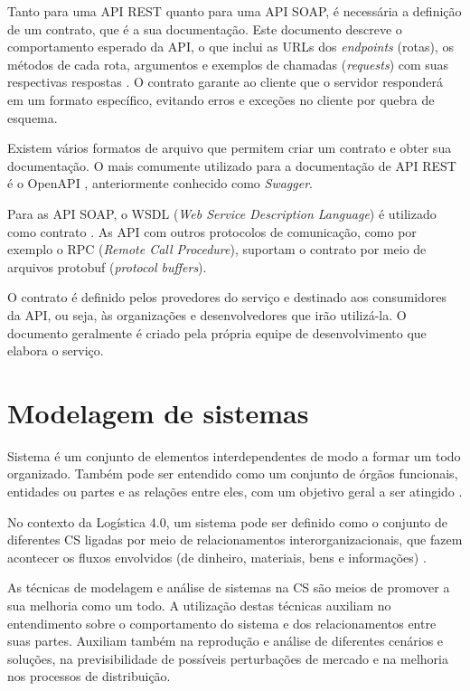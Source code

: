 Tanto para uma API REST quanto para uma API SOAP, é necessária a definição de um contrato, que é a sua documentação. Este documento descreve o comportamento esperado da API, o que inclui as URLs dos \textit{endpoints} (rotas), os métodos de cada rota, argumentos e exemplos de chamadas (\textit{requests}) com suas respectivas respostas \cite{santos2020apicontract}. O contrato garante ao cliente que o servidor responderá em um formato específico, evitando erros e exceções no cliente por quebra de esquema.

Existem vários formatos de arquivo que permitem criar um contrato e obter sua documentação. O mais comumente utilizado para a documentação de API REST é o OpenAPI \cite{santos2020openapi}, anteriormente conhecido como \textit{Swagger}.

Para as API SOAP, o WSDL (\textit{Web Service Description Language}) é utilizado como contrato \cite{booth2004webservice}. As API com outros protocolos de comunicação, como por exemplo o RPC (\textit{Remote Call Procedure}), suportam o contrato por meio de arquivos protobuf (\textit{protocol buffers}).

O contrato é definido pelos provedores do serviço e destinado aos consumidores da API, ou seja, às organizações e desenvolvedores que irão utilizá-la. O documento geralmente é criado pela própria equipe de desenvolvimento que elabora o serviço.

\section{Modelagem de sistemas}
\label{sec:modelagem-de-sistemas}

Sistema é um conjunto de elementos interdependentes de modo a formar um todo organizado. Também pode ser entendido como um conjunto de órgãos funcionais, entidades ou partes e as relações entre eles, com um objetivo geral a ser atingido \cite{mulbert2005sistemas}.

No contexto da Logística 4.0, um sistema pode ser definido como o conjunto de diferentes CS ligadas por meio de relacionamentos interorganizacionais, que fazem acontecer os fluxos envolvidos (de dinheiro, materiais, bens e informações) \cite{oliveira2016supplychain}.

As técnicas de modelagem e análise de sistemas na CS são meios de promover a sua melhoria como um todo. A utilização destas técnicas auxiliam no entendimento sobre o comportamento do sistema e dos relacionamentos entre suas partes. Auxiliam também na reprodução e análise de diferentes cenários e soluções, na previsibilidade de possíveis perturbações de mercado e na melhoria nos processos de distribuição.

